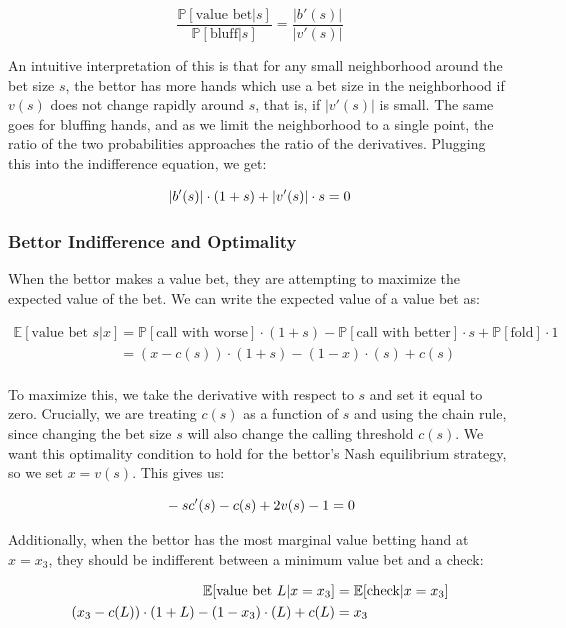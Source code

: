 \documentclass[a4paper,12pt]{article}
\begin{document}
\[ \frac{\mathbb{P}[\text{value bet} | s]}{\mathbb{P}[\text{bluff} | s]} = \frac{|b'(s)|}{|v'(s)|}\]

An intuitive interpretation of this is that for any small neighborhood around the bet size $s$, the bettor has more hands which use a bet size in the neighborhood if $v(s)$ does not change rapidly around $s$, that is, if $|v'(s)|$ is small. The same goes for bluffing hands, and as we limit the neighborhood to a single point, the ratio of the two probabilities approaches the ratio of the derivatives. Plugging this into the indifference equation, we get:

\begin{equation}{\label{callindiff}}
    |b'(s)| \cdot (1 + s) + |v'(s)| \cdot s = 0
\end{equation}

\subsubsection{Bettor Indifference and Optimality}

When the bettor makes a value bet, they are attempting to maximize the expected value of the bet. We can write the expected value of a value bet as:

\begin{align*}
    \mathbb{E}[\text{value bet } s | x] & = \mathbb{P}[\text{call with worse}] \cdot (1+s) - \mathbb{P}[\text{call with better}] \cdot s + \mathbb{P}[\text{fold}] \cdot 1 \\
    & = (x-c(s)) \cdot (1+s) - (1-x) \cdot (s) + c(s)\\
\end{align*}

To maximize this, we take the derivative with respect to $s$ and set it equal to zero. Crucially, we are treating $c(s)$ as a function of $s$ and using the chain rule, since changing the bet size $s$ will also change the calling threshold $c(s)$. We want this optimality condition to hold for the bettor's Nash equilibrium strategy, so we set $x=v(s)$. This gives us:

\begin{equation}{\label{valueoptimality}}
    -sc'(s) - c(s) + 2 v(s) - 1 = 0
\end{equation}

Additionally, when the bettor has the most marginal value betting hand at $x=x_3$, they should be indifferent between a minimum value bet and a check: 

\begin{align}{\label{valueindiff}}
    \nonumber \mathbb{E}[\text{value bet } L | x=x_3] & = \mathbb{E}[\text{check} | x=x_3]\\ 
    (x_3-c(L)) \cdot (1+L) - (1-x_3) \cdot (L) + c(L) & = x_3
\end{align}
\end{document}
